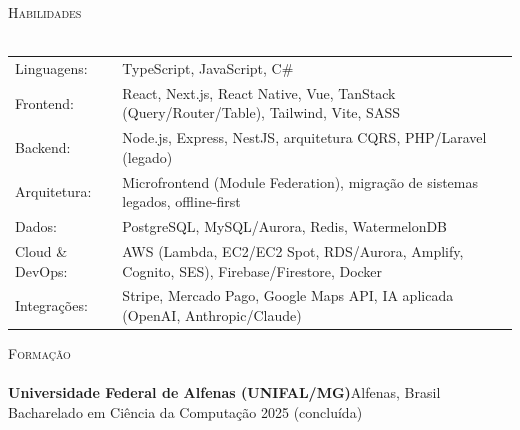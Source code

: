 \documentclass[a4paper]{article}
\newcommand{\lineunder}{
    \vspace*{-8pt} \\
    \hspace*{-18pt} \hrulefill \\
}
\newcommand{\header}[1]{
    {\hspace*{-18pt}\vspace*{6pt} \textsc{#1}}
    \vspace*{-6pt} \lineunder
}
\begin{document}
    \vspace{1mm}

    \header{Habilidades}
    \vspace{2mm}
    \begin{longtable}{p{4cm}p{12cm}}
        Linguagens: & TypeScript, JavaScript, C\# \\
        Frontend: & React, Next.js, React Native, Vue, TanStack (Query/Router/Table), Tailwind, Vite, SASS \\
        Backend: & Node.js, Express, NestJS, arquitetura CQRS, PHP/Laravel (legado) \\
        Arquitetura: & Microfrontend (Module Federation), migra\c{c}\~ao de sistemas legados, offline-first \\
        Dados: & PostgreSQL, MySQL/Aurora, Redis, WatermelonDB \\
        Cloud \& DevOps: & AWS (Lambda, EC2/EC2 Spot, RDS/Aurora, Amplify, Cognito, SES), Firebase/Firestore, Docker \\
        Integra\c{c}\~oes: & Stripe, Mercado Pago, Google Maps API, IA aplicada (OpenAI, Anthropic/Claude) \\
    \end{longtable}
    \vspace{1mm}

    \header{Forma\c{c}\~ao}
    \vspace{2mm}
    \textbf{Universidade Federal de Alfenas (UNIFAL/MG)}\hfill Alfenas, Brasil\\
    Bacharelado em Ci\^encia da Computa\c{c}\~ao \hfill 2025 (conclu\'ida)\\
\end{document}
